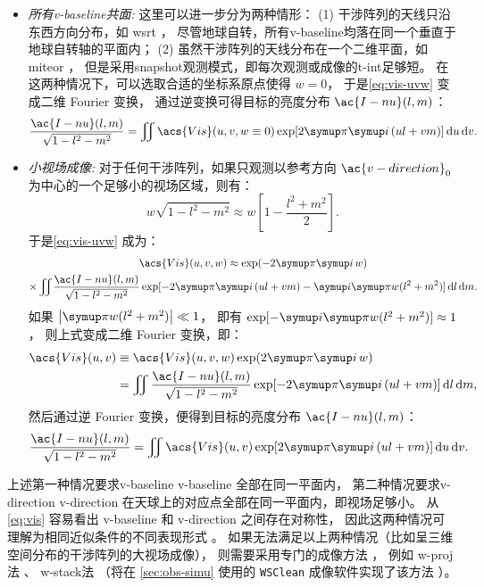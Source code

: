 \begin{itemize}
\item
\emph{所有\acl{v-baseline}共面:}
这里可以进一步分为两种情形：
(1) 干涉阵列的天线只沿东西方向分布，如 \ac{wsrt} \cite{hogbom1974wsrt}，
尽管地球自转，所有\acl{v-baseline}均落在同一个垂直于地球自转轴的平面内；
(2) 虽然干涉阵列的天线分布在一个二维平面，如 \ac{miteor} \cite{zheng2014}，
但是采用\ac{snapshot}观测模式，即每次观测或成像的\ac{t-int}足够短。
在这两种情况下，可以选取合适的坐标系原点使得 $w = 0$，
于是\autoref{eq:vis-uvw} 变成二维 Fourier 变换，
通过逆变换可得目标的亮度分布 $\ac{I-nu}(l,m)$：
\begin{equation}
  \label{eq:vis-inv1}
  \frac{\ac{I-nu}(l,m)}{\sqrt{1-l^2-m^2}}
    = \iint \acs{Vis}(u,v, w \equiv 0)
      \exp [2\Cpi\Ci\, (ul+vm)] \,\D{u}\,\D{v} .
\end{equation}

\item
\emph{小视场成像:}
对于任何干涉阵列，如果只观测以参考方向 $\ac{v-direction}_0$
为中心的一个足够小的视场区域，则有：
\begin{equation}
  w \sqrt{1-l^2-m^2}
    \approx w \left[ 1 - \frac{l^2+m^2}{2} \right] .
\end{equation}
于是\autoref{eq:vis-uvw} 成为：
\begin{multline}
  \acs{Vis}(u,v,w) \approx \exp (-2\Cpi\Ci\,w) \\
    \times \iint\! \frac{\ac{I-nu}(l,m)}{\sqrt{1-l^2-m^2}}
    \exp [-2\Cpi\Ci\, (ul+vm) -\Ci\Cpi w(l^2+m^2)] \,\D{l}\,\D{m} .
\end{multline}
如果 $\big| \Cpi w(l^2+m^2) \big| \ll 1$，
即有 $\exp [-\Ci\Cpi w(l^2+m^2)] \approx 1$，
则上式变成二维 Fourier 变换，即：
\begin{align}
  \acs{Vis}(u,v)
    & \equiv \acs{Vis}(u,v,w) \exp (2\Cpi\Ci\,w)  \\
    & = \iint \frac{\ac{I-nu}(l,m)}{\sqrt{1-l^2-m^2}}
    \exp [-2\Cpi\Ci\, (ul+vm)] \,\D{l}\,\D{m} ,
  \label{eq:vis-uv}
\end{align}
然后通过逆 Fourier 变换，便得到目标的亮度分布 $\ac{I-nu}(l,m)$：
\begin{equation}
  \label{eq:vis-inv2}
  \frac{\ac{I-nu}(l,m)}{\sqrt{1-l^2-m^2}}
    = \iint \acs{Vis}(u,v)
      \exp [2\Cpi\Ci\, (ul+vm)] \,\D{u}\,\D{v} .
\end{equation}

\end{itemize}

上述第一种情况要求\acl{v-baseline} \ac{v-baseline} 全部在同一平面内，
第二种情况要求\acl{v-direction} \ac{v-direction}
在天球上的对应点全部在同一平面内，即视场足够小。
从\autoref{eq:vis} 容易看出 \ac{v-baseline} 和 \ac{v-direction} 之间存在对称性，
因此这两种情况可理解为相同近似条件的不同表现形式 \cite{clark1999}。
如果无法满足以上两种情况（比如呈三维空间分布的干涉阵列的大视场成像），
则需要采用专门的成像方法 \cite{cornwell1992,sault2007}，
例如 \ac{w-proj}法 \cite{cornwell2008}、
\ac{w-stack}法 \cite{humphreys2011}
（将在 \autoref{sec:obs-simu} 使用的 \texttt{WSClean} 成像软件实现了该方法
\cite{offringa2014,offringa2017}）。

